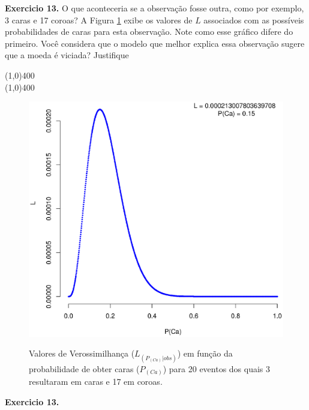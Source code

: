 \begin{refsection}
\begin{blackBlock}{\textbf{Exercicio 13.}}
O que aconteceria se a observação fosse outra, como por exemplo, 3 caras e 17 coroas? A Figura \ref{fig:plot2} exibe os valores de $L$ associados com as possíveis probabilidades de caras para esta observação. Note como esse gráfico difere do primeiro. Você considera que o modelo que melhor explica essa observação sugere que a moeda é viciada? Justifique

\end{blackBlock}

\begin{center}
\line(1,0){400}\\
\line(1,0){400}\\
\end{center}

  \begin{figure}[h!]
      {\includegraphics[scale=0.55]{figures/tut12/plot_2.eps}}
      {\caption{Valores de Verossimilhança ($L_{(P_{(Ca)}|obs)}$) em função da probabilidade de obter caras ($P_{(Ca)}$) para 20 eventos dos quais 3 resultaram em caras e 17 em coroas.}\label{fig:plot2}}
  \end{figure}


\begin{blackBlock}{\textbf{Exercicio 13.}}\label{tut12:ex:13.2}


\end{blackBlock}
\end{refsection}

